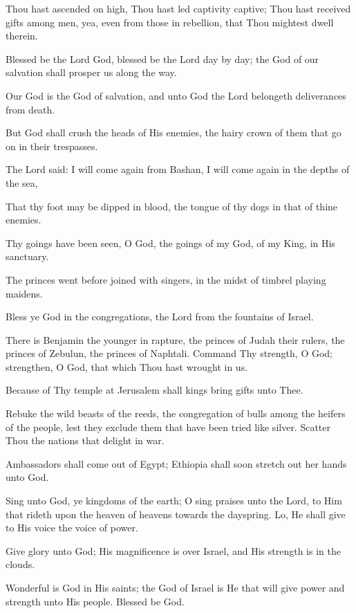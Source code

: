 Thou hast ascended on high, Thou hast led captivity captive; Thou hast received gifts among men, yea, even from those in rebellion, that Thou mightest dwell therein.

Blessed be the Lord God, blessed be the Lord day by day; the God of our salvation shall prosper us along the way.

Our God is the God of salvation, and unto God the Lord belongeth deliverances from death.

But God shall crush the heads of His enemies, the hairy crown of them that go on in their trespasses.

The Lord said: I will come again from Bashan, I will come again in the depths of the sea,

That thy foot may be dipped in blood, the tongue of thy dogs in that of thine enemies.

Thy goings have been seen, O God, the goings of my God, of my King, in His sanctuary.

The princes went before joined with singers, in the midst of timbrel playing maidens.

Bless ye God in the congregations, the Lord from the fountains of Israel.

There is Benjamin the younger in rapture, the princes of Judah their rulers, the princes of Zebulun, the princes of Naphtali. Command Thy strength, O God; strengthen, O God, that which Thou hast wrought in us.

Because of Thy temple at Jerusalem shall kings bring gifts unto Thee.

Rebuke the wild beasts of the reeds, the congregation of bulls among the heifers of the people, lest they exclude them that have been tried like silver. Scatter Thou the nations that delight in war.

Ambassadors shall come out of Egypt; Ethiopia shall soon stretch out her hands unto God.

Sing unto God, ye kingdoms of the earth; O sing praises unto the Lord, to Him that rideth upon the heaven of heavens towards the dayspring. Lo, He shall give to His voice the voice of power.

Give glory unto God; His magnificence is over Israel, and His strength is in the clouds.

Wonderful is God in His saints; the God of Israel is He that will give power and strength unto His people. Blessed be God.

